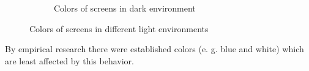 \begin{figure}[h]
\begin{subfigure}[b]{0.4\textwidth}
                \caption{Colors of screens in dark environment}
                \label{fig:mouse}
        \end{subfigure}
        \caption{Colors of screens in different light environments}\label{fig:screen_colors_in_enviroments}
\end{figure}
By empirical research there were established colors (e. g. blue and white) which are least affected by this behavior.
